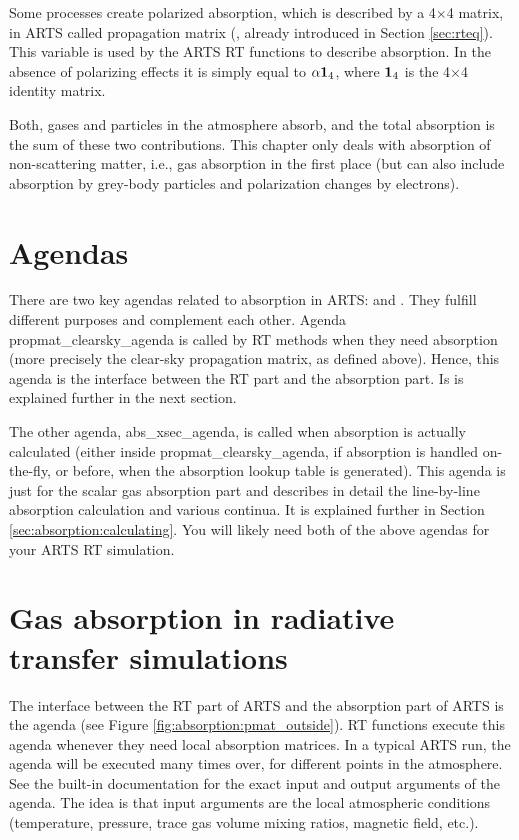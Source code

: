 Some processes create polarized absorption, which is described by a
4$\times$4 matrix, in ARTS called propagation matrix
(, already introduced in Section \ref{sec:rteq}).  This variable is used by the ARTS RT
functions to describe absorption.  In the absence of polarizing
effects it is simply equal to ${\alpha} \mathbf{1}_4$, where $\mathbf{1}_4$
is the 4$\times$4 identity matrix. 

Both, gases and particles in the atmosphere absorb, and the total absorption is
the sum of these two contributions.
This chapter only deals with absorption of non-scattering matter, i.e., gas
absorption in the first place (but can also include absorption by grey-body
particles and polarization changes by electrons).

\section{Agendas}
\label{sec:absorption:agendas}

There are two key agendas related to absorption in ARTS:
 and
.  They fulfill different purposes and
complement each other.  Agenda propmat\_clearsky\_agenda is called by
RT methods when they need absorption (more precisely the clear-sky
propagation matrix, as defined above). Hence, this agenda is the
interface between the RT part and the absorption part. Is is explained
further in the next section. 

The other agenda, abs\_xsec\_agenda, is called when absorption is
actually calculated (either inside propmat\_clearsky\_agenda, if
absorption is handled on-the-fly, or before, when the absorption
lookup table is generated).  This agenda is just for the scalar gas
absorption part and describes in detail the line-by-line absorption
calculation and various continua.  It is explained further in Section
\ref{sec:absorption:calculating}.  You will likely need both of the
above agendas for your ARTS RT simulation.


\section{Gas absorption in radiative transfer simulations}
\label{sec:absorption:abs-rt}

The interface between the RT part of ARTS and the
absorption part of ARTS is the agenda
 (see Figure \ref{fig:absorption:pmat_outside}).  RT functions execute this
agenda whenever they need local absorption matrices.  In a typical
ARTS run, the agenda will be executed many times over, for different
points in the atmosphere.  See the built-in documentation for the
exact input and output arguments of the agenda.  The idea is that
input arguments are the local atmospheric conditions (temperature,
pressure, trace gas volume mixing ratios, magnetic field, etc.).

